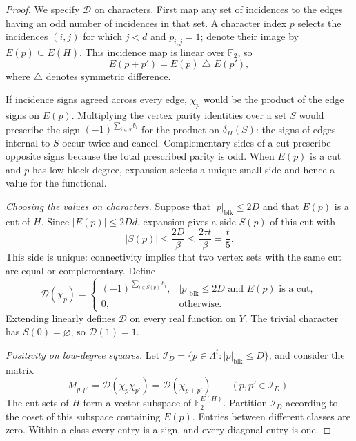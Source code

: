 \begin{proof}
  We specify \(\mathcal D\) on characters.  First map any set of
  incidences to the edges having an odd number of incidences in that set.
  A character index \(p\) selects the incidences \((i,j)\) for which
  \(j<d\) and \(p_{i,j}=1\); denote their image by
  \(E(p)\subseteq E(H)\).  This incidence map is linear over
  \(\mathbb F_2\), so
  \[
    E(p+p')=E(p)\mathbin\triangle E(p'),
  \]
  where \(\triangle\) denotes symmetric difference.

  If incidence signs agreed across every edge, \(\chi_p\) would be the
  product of the edge signs on \(E(p)\).  Multiplying the vertex parity
  identities over a set \(S\) would prescribe the sign
  \((-1)^{\sum_{i\in S}b_i}\) for the product on \(\delta_H(S)\):
  the signs of edges internal to \(S\) occur twice and cancel.
  Complementary sides of a cut prescribe opposite signs because the
  total prescribed parity is odd.  When \(E(p)\) is a cut and \(p\) has
  low block degree, expansion selects a unique small side and hence a
  value for the functional.

  \emph{Choosing the values on characters.}
  Suppose that \(|p|_{\mathrm{blk}}\leq2D\) and that \(E(p)\) is a cut
  of \(H\).  Since \(|E(p)|\leq2Dd\), expansion gives a side \(S(p)\)
  of this cut with
  \begin{equation}
    |S(p)|\leq\frac{2D}{\beta}
       \leq\frac{2\tau t}{\beta}=\frac t5.
    \label{eq:parity-small-side}
  \end{equation}
  This side is unique: connectivity implies that two vertex sets with
  the same cut are equal or complementary.  Define
  \begin{equation}
    \mathcal D(\chi_p)=
    \begin{cases}
      (-1)^{\sum_{i\in S(p)}b_i},
        & |p|_{\mathrm{blk}}\leq2D
          \text{ and }E(p)\text{ is a cut},\\
      0,&\text{otherwise}.
    \end{cases}
    \label{eq:parity-functional-definition}
  \end{equation}
  Extending linearly defines \(\mathcal D\) on every real function on
  \(Y\).  The trivial character has \(S(0)=\varnothing\), so
  \(\mathcal D(1)=1\).

  \emph{Positivity on low-degree squares.}
  Let \(\mathcal I_D=\{p\in\Lambda^t:|p|_{\mathrm{blk}}\leq D\}\),
  and consider the matrix
  \[
    M_{p,p'}=\mathcal D(\chi_p\chi_{p'})
             =\mathcal D(\chi_{p+p'})
    \qquad(p,p'\in\mathcal I_D).
  \]
  The cut sets of \(H\) form a vector subspace of
  \(\mathbb F_2^{E(H)}\).  Partition \(\mathcal I_D\) according to the
  coset of this subspace containing \(E(p)\).  Entries between different
  classes are zero.  Within a class every entry is a sign, and every
  diagonal entry is one.


\end{proof}
